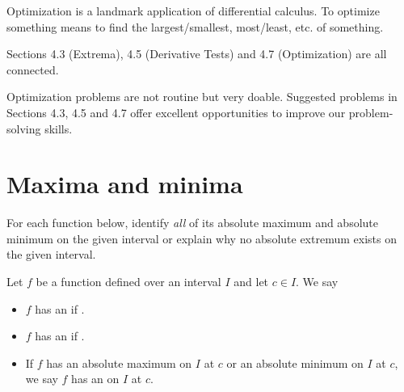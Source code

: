 \documentclass[../main.tex]{subfiles}
\begin{document}
 Optimization is a landmark application of differential calculus.  
To optimize something means to find the largest/smallest, most/least, etc. of something. 

Sections 4.3 (Extrema), 4.5 (Derivative Tests) and 4.7 (Optimization) are all connected.

\faExclamationTriangle{} Optimization problems are not routine but very doable. Suggested problems in Sections 4.3, 4.5 and 4.7 offer excellent opportunities to improve our problem-solving skills.

\section{Maxima and minima}

\begin{example} \label{ex:abs-extrema}
  For each function below, identify \emph{all} of its absolute maximum and absolute minimum on the given interval or explain why no absolute extremum exists on the given interval.

  \begin{center}
    
    
    

    \vfill{}

    
    
    
  \end{center}
\end{example}

\begin{mdframed}[style=withref-compact]
  Let \(f\) be a function defined over an interval \(I\) and let \(c \in I\).  We say
  \begin{itemize}
    \item \(f\) has an  if \underline{\hspace{2.5in}}.

    \item \(f\) has an  if \underline{\hspace{2.5in}}.

    \item If \(f\) has an absolute maximum on \(I\) at \(c\) or an absolute minimum on \(I\) at \(c\), we say \(f\) has an  on \(I\) at \(c\).
  \end{itemize}
\end{mdframed}
\end{document}
